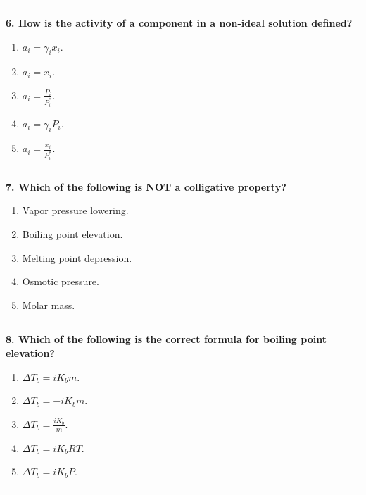 \documentclass[
  9pt,
]{extbook}
\providecommand{\tightlist}{%
  \setlength{\itemsep}{0pt}\setlength{\parskip}{0pt}}
\theoremstyle{definition}
\theoremstyle{definition}
\theoremstyle{definition}
\theoremstyle{definition}
\theoremstyle{remark}
\begin{document}
\begin{center}\rule{0.5\linewidth}{0.5pt}\end{center}

\textbf{6. How is the activity of a component in a non-ideal solution defined?}

\begin{enumerate}
\def\labelenumi{\alph{enumi}.}
\tightlist
\item
  \(a_i = \gamma_i x_i\).
\item
  \(a_i = x_i\).
\item
  \(a_i = \frac{P_i}{P^*_i}\).
\item
  \(a_i = \gamma_i P_i\).
\item
  \(a_i = \frac{x_i}{P^*_i}\).
\end{enumerate}

\begin{center}\rule{0.5\linewidth}{0.5pt}\end{center}

\textbf{7. Which of the following is NOT a colligative property?}

\begin{enumerate}
\def\labelenumi{\alph{enumi}.}
\tightlist
\item
  Vapor pressure lowering.
\item
  Boiling point elevation.
\item
  Melting point depression.
\item
  Osmotic pressure.
\item
  Molar mass.
\end{enumerate}

\begin{center}\rule{0.5\linewidth}{0.5pt}\end{center}

\textbf{8. Which of the following is the correct formula for boiling point elevation?}

\begin{enumerate}
\def\labelenumi{\alph{enumi}.}
\tightlist
\item
  \(\Delta T_b = iK_b m\).
\item
  \(\Delta T_b = -iK_b m\).
\item
  \(\Delta T_b = \frac{iK_b}{m}\).
\item
  \(\Delta T_b = iK_b RT\).
\item
  \(\Delta T_b = iK_b P\).
\end{enumerate}

\begin{center}\rule{0.5\linewidth}{0.5pt}\end{center}
\end{document}
